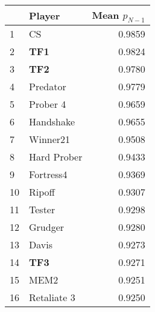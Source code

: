 \begin{tabular}{llr}
\toprule
{} &       Player &  Mean $p_{N-1}$ \\
\midrule
1  &           CS &          0.9859 \\
2  &          \textbf{TF1} &          0.9824 \\
3  &          \textbf{TF2} &          0.9780 \\
4  &     Predator &          0.9779 \\
5  &     Prober 4 &          0.9659 \\
6  &    Handshake &          0.9655 \\
7  &     Winner21 &          0.9508 \\
8  &  Hard Prober &          0.9433 \\
9  &    Fortress4 &          0.9369 \\
10 &       Ripoff &          0.9307 \\
11 &       Tester &          0.9298 \\
12 &      Grudger &          0.9280 \\
13 &        Davis &          0.9273 \\
14 &          \textbf{TF3} &          0.9271 \\
15 &         MEM2 &          0.9251 \\
16 &  Retaliate 3 &          0.9250 \\
\bottomrule
\end{tabular}
